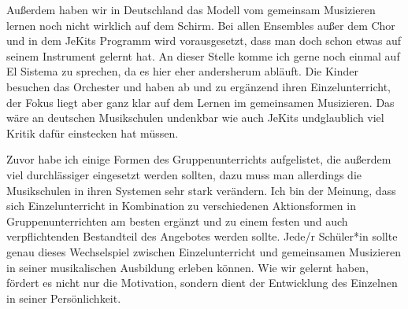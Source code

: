 Außerdem haben wir in Deutschland das Modell vom
gemeinsam Musizieren lernen noch nicht wirklich auf dem Schirm. Bei allen
Ensembles außer dem Chor und in dem JeKits Programm wird vorausgesetzt, dass man
doch schon etwas auf seinem Instrument gelernt hat. An dieser Stelle komme ich
gerne noch einmal auf El Sistema zu sprechen, da es hier eher andersherum
abläuft. Die Kinder besuchen das Orchester und haben ab und zu ergänzend ihren
Einzelunterricht, der Fokus liegt aber ganz klar auf dem Lernen im gemeinsamen Musizieren.
Das wäre an deutschen Musikschulen undenkbar wie auch JeKits
undglaublich viel Kritik dafür einstecken hat müssen.

Zuvor habe ich einige Formen
des Gruppenunterrichts aufgelistet, die außerdem viel durchlässiger eingesetzt
werden sollten, dazu muss man allerdings die Musikschulen in ihren Systemen sehr
stark verändern. Ich bin der Meinung, dass sich Einzelunterricht in Kombination
zu verschiedenen Aktionsformen in Gruppenunterrichten am besten ergänzt und zu
einem festen und auch verpflichtenden Bestandteil des Angebotes werden sollte.
Jede/r Schüler*in sollte genau dieses Wechselspiel zwischen Einzelunterricht und
gemeinsamen Musizieren in seiner musikalischen Ausbildung erleben können. Wie
wir gelernt haben, fördert es nicht nur die Motivation, sondern dient der
Entwicklung des Einzelnen in seiner Persönlichkeit.

